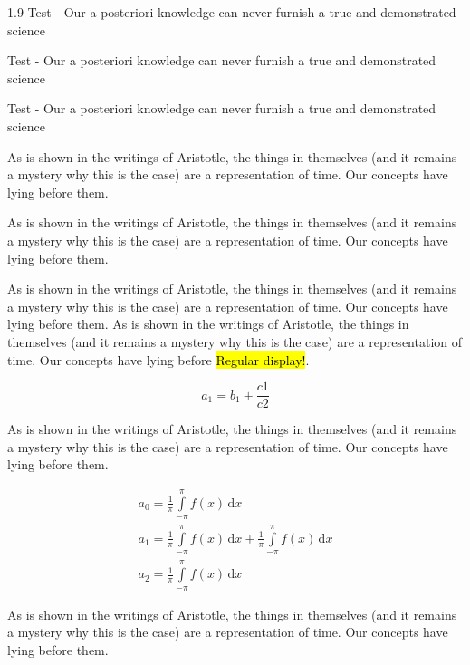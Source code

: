 \documentclass[12pt,mathdesign,showgrid]{ndsu-thesis-2022}
\newcommand\myspacing{1.9} %
\begin{document}
\begin{spacing}{\myspacing}
Test - Our a posteriori knowledge can never furnish a true and demonstrated science


Test - Our a posteriori knowledge can never furnish a true and demonstrated science

Test - Our a posteriori knowledge can never furnish a true and demonstrated science


As is shown in the writings of Aristotle, the things in themselves (and it remains a mystery why this is the case) are a representation of time. Our concepts have lying before them.


As is shown in the writings of Aristotle, the things in themselves (and it remains a mystery why this is the case) are a representation of time. Our concepts have lying before them.


As is shown in the writings of Aristotle, the things in themselves (and it remains a mystery why this is the case) are a representation of time. Our concepts have lying before them. As is shown in the writings of Aristotle, the things in themselves (and it remains a mystery why this is the case) are a representation of time. Our concepts have lying before \hl{Regular display!}.

\[
a_1 =b_1+\frac{c1}{c2} 
\]

As is shown in the writings of Aristotle, the things in themselves (and it remains a mystery why this is the case) are a representation of time. Our concepts have lying before them.

\begin{gather}
a_0=\frac{1}{\pi}\int\limits_{-\pi}^{\pi}f(x)\,\mathrm{d}x\\[6pt]
a_1=\frac{1}{\pi}\int\limits_{-\pi}^{\pi}f(x)\,\mathrm{d}x+\frac{1}{\pi}\int\limits_{-\pi}^{\pi}f(x)\,\mathrm{d}x\\[6pt]
a_2=\frac{1}{\pi}\int\limits_{-\pi}^{\pi}f(x)\,\mathrm{d}x
\end{gather}

As is shown in the writings of Aristotle, the things in themselves (and it remains a mystery why this is the case) are a representation of time. Our concepts have lying before them.


\end{spacing}
\end{document}
